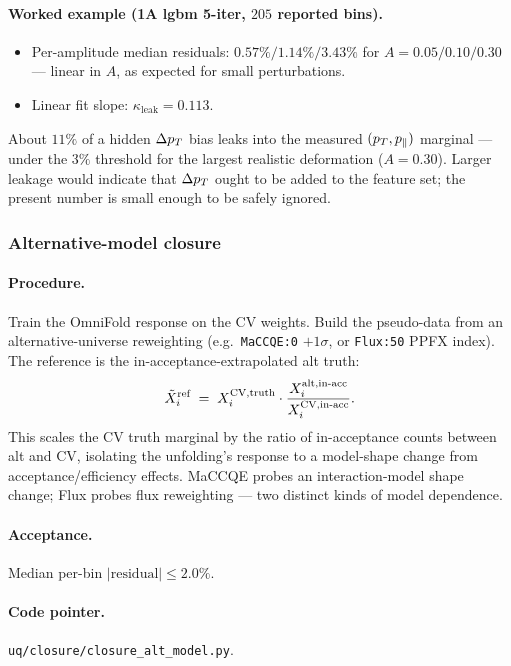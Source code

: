 \paragraph{Worked example (1A lgbm 5-iter, $205$ reported bins).}
\begin{itemize}[nosep]
  \item Per-amplitude median residuals: $0.57\% / 1.14\% / 3.43\%$
        for $A = 0.05/0.10/0.30$ --- linear in $A$, as expected for
        small perturbations.
  \item Linear fit slope: $\kappa_{\text{leak}} = \boxed{0.113}$.
\end{itemize}
About $11\%$ of a hidden $\Delta p_{T}$ bias leaks into the measured
$(p_{T},p_{\parallel})$ marginal --- under the $3\%$ threshold for the largest
realistic deformation ($A=0.30$). Larger leakage would indicate that
$\Delta p_{T}$ ought to be added to the feature set; the present number is
small enough to be safely ignored.

\subsubsection{Alternative-model closure}
\label{sec:closure-alt}

\paragraph{Procedure.}
Train the OmniFold response on the CV weights. Build the pseudo-data
from an alternative-universe reweighting (e.g.\ \texttt{MaCCQE:0}
$+1\sigma$, or \texttt{Flux:50} PPFX index). The reference is the
in-acceptance-extrapolated alt truth:
\begin{equation}
\tilde X^{\text{ref}}_{i}
\;=\;
X^{\text{CV},\text{truth}}_{i}\cdot
\frac{X^{\text{alt},\text{in-acc}}_{i}}{X^{\text{CV},\text{in-acc}}_{i}}.
\end{equation}
This scales the CV truth marginal by the ratio of in-acceptance
counts between alt and CV, isolating the unfolding's response to
a model-shape change from acceptance/efficiency effects. MaCCQE
probes an interaction-model shape change; Flux probes flux
reweighting --- two distinct kinds of model dependence.

\paragraph{Acceptance.}
Median per-bin $|\text{residual}| \le 2.0\%$.

\paragraph{Code pointer.}
\texttt{uq/closure/closure\_alt\_model.py}.

